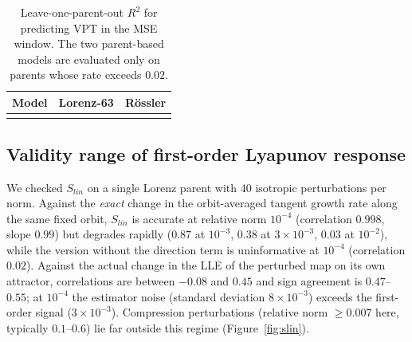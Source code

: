 \documentclass[11pt]{article}
\begin{document}
\begin{table}[t]
\centering\scriptsize
\caption{Log-linear fit of VPT on $\ln\mathrm{MSE}$ under two selection rules. $\lambda_{\mathrm{eff}}=-1/(2\,\mathrm{slope})$ in inverse time units. Last column (window fit only): Spearman correlation across parents of per-parent $\lambda_{\mathrm{eff}}$ with the parent's Lyapunov exponent, tangent growth rate, and mean log largest singular value rate.}\label{tab:law}
\end{table}

\begin{table}[t]
\centering\small
\caption{Leave-one-parent-out $R^2$ for predicting VPT in the MSE window. The two parent-based models are evaluated only on parents whose rate exceeds $0.02$.}\label{tab:loo}
\begin{tabular}{lcc}
\toprule
Model & Lorenz-63 & R\"ossler\\
\midrule
\\
\bottomrule
\end{tabular}
\end{table}

\subsection{Validity range of first-order Lyapunov response}
We checked $S_{lin}$ on a single Lorenz parent with 40 isotropic perturbations per norm. Against the \emph{exact} change in the orbit-averaged tangent growth rate along the same fixed orbit, $S_{lin}$ is accurate at relative norm $10^{-4}$ (correlation $0.998$, slope $0.99$) but degrades rapidly ($0.87$ at $10^{-3}$, $0.38$ at $3\times10^{-3}$, $0.03$ at $10^{-2}$), while the version without the direction term is uninformative at $10^{-4}$ (correlation $0.02$). Against the actual change in the LLE of the perturbed map on its own attractor, correlations are between $-0.08$ and $0.45$ and sign agreement is $0.47$--$0.55$; at $10^{-4}$ the estimator noise (standard deviation $8\times10^{-3}$) exceeds the first-order signal ($3\times10^{-3}$). Compression perturbations (relative norm $\ge0.007$ here, typically $0.1$--$0.6$) lie far outside this regime (Figure~\ref{fig:slin}).
\end{document}
